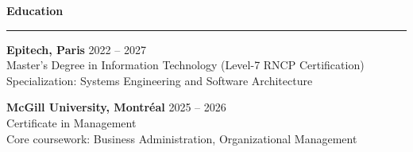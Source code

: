 \documentclass[9pt]{extarticle}
\begin{document}
\par\vspace{8pt}

{\large\bfseries Education}
\par\vspace{-8pt}
\rule{\linewidth}{0.4pt}
\par\vspace{5pt}

{\bfseries Epitech, Paris} \hfill 2022 -- 2027 \\
Master's Degree in Information Technology (Level-7 RNCP Certification) \\
Specialization: Systems Engineering and Software Architecture

\vspace{6pt}

{\bfseries McGill University, Montréal} \hfill 2025 -- 2026 \\
Certificate in Management \\
Core coursework: Business Administration, Organizational Management
\end{document}
